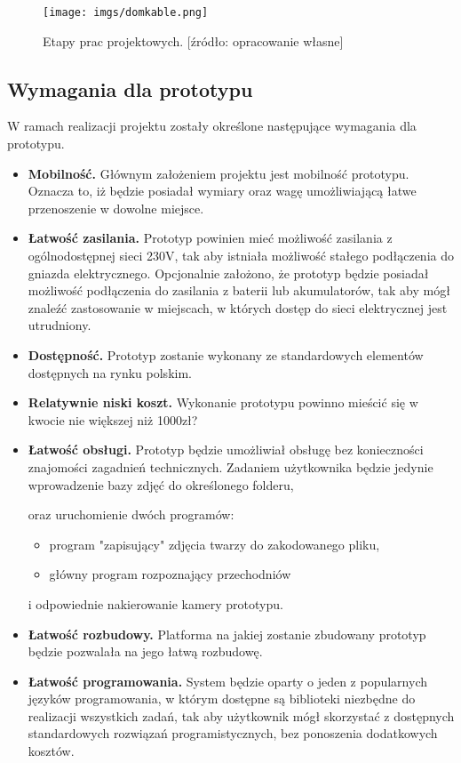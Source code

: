 \documentclass[a4paper,12pt,reqno]{article}
\begin{document}
\begin{figure}[!ht]%
\centering
\texttt{[image: imgs/domkable.png]}
\caption{Etapy prac projektowych. [źródło: opracowanie własne] \label{etapypracy}}
\quad
\end{figure}

\subsection{Wymagania dla prototypu}

W ramach realizacji projektu zostały określone następujące wymagania dla prototypu.

\begin{itemize}
	\item \textbf{Mobilność.} Głównym założeniem projektu jest mobilność prototypu. Oznacza to, iż będzie posiadał wymiary oraz wagę umożliwiającą łatwe przenoszenie w dowolne miejsce.
	\item \textbf{Łatwość zasilania.} Prototyp powinien mieć możliwość zasilania z ogólnodostępnej sieci 230V, tak aby istniała możliwość stałego podłączenia do gniazda elektrycznego. Opcjonalnie założono, że prototyp będzie posiadał możliwość podłączenia do zasilania z baterii lub akumulatorów, tak aby mógł znaleźć zastosowanie w miejscach, w których dostęp do sieci elektrycznej jest utrudniony.
	\item \textbf{Dostępność.} Prototyp zostanie wykonany ze standardowych elementów dostępnych na rynku polskim.
	\item \textbf{Relatywnie niski koszt.} Wykonanie prototypu powinno mieścić się w kwocie nie większej niż \textcolor{to_check_at_end}{1000zł?}
	\item \textbf{Łatwość obsługi.} Prototyp będzie umożliwiał obsługę bez konieczności znajomości zagadnień technicznych. Zadaniem użytkownika będzie jedynie wprowadzenie bazy zdjęć do określonego folderu, \textcolor{new}{oraz uruchomienie dwóch programów:
		\begin{itemize}
			\item program "zapisujący" zdjęcia twarzy do zakodowanego pliku,
			\item główny program rozpoznający przechodniów
		\end{itemize}	
	}
	i odpowiednie nakierowanie kamery prototypu.
	\item \textbf{Łatwość rozbudowy.} Platforma na jakiej zostanie zbudowany prototyp będzie pozwalała na jego łatwą rozbudowę.
	\item \textbf{Łatwość programowania.} System będzie oparty o jeden z popularnych języków programowania, w którym dostępne są biblioteki niezbędne do realizacji wszystkich zadań, tak aby użytkownik mógł skorzystać z dostępnych standardowych rozwiązań programistycznych, bez ponoszenia dodatkowych kosztów.
\end{itemize}
\end{document}
